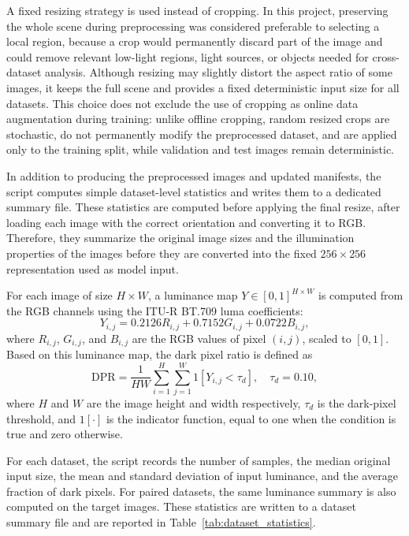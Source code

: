 A fixed resizing strategy is used instead of cropping. In this project, preserving the whole scene during preprocessing was considered preferable to selecting a local region, because a crop would permanently discard part of the image and could remove relevant low-light regions, light sources, or objects needed for cross-dataset analysis. Although resizing may slightly distort the aspect ratio of some images, it keeps the full scene and provides a fixed deterministic input size for all datasets. This choice does not exclude the use of cropping as online data augmentation during training: unlike offline cropping, random resized crops are stochastic, do not permanently modify the preprocessed dataset, and are applied only to the training split, while validation and test images remain deterministic.

In addition to producing the preprocessed images and updated manifests, the script computes simple dataset-level statistics and writes them to a dedicated summary file. These statistics are computed before applying the final resize, after loading each image with the correct orientation and converting it to RGB. Therefore, they summarize the original image sizes and the illumination properties of the images before they are converted into the fixed $256 \times 256$ representation used as model input.

For each image of size $H \times W$, a luminance map $Y \in [0,1]^{H \times W}$ is computed from the RGB channels using the ITU-R BT.709 luma coefficients:
\begin{equation}
	Y_{i,j} = 0.2126R_{i,j} + 0.7152G_{i,j} + 0.0722B_{i,j},
	\label{eq:luminance}
\end{equation}
where $R_{i,j}$, $G_{i,j}$, and $B_{i,j}$ are the RGB values of pixel $(i,j)$, scaled to $[0,1]$. Based on this luminance map, the dark pixel ratio is defined as
\begin{equation}
	\mathrm{DPR} =
	\frac{1}{HW}
	\sum_{i=1}^{H}
	\sum_{j=1}^{W}
	1\left[Y_{i,j} < \tau_d\right],
	\quad
	\tau_d = 0.10,
	\label{eq:dpr}
\end{equation}
where $H$ and $W$ are the image height and width respectively, $\tau_d$ is the dark-pixel threshold, and $1[\cdot]$ is the indicator function, equal to one when the condition is true and zero otherwise.

For each dataset, the script records the number of samples, the median original input size, the mean and standard deviation of input luminance, and the average fraction of dark pixels. For paired datasets, the same luminance summary is also computed on the target images. These statistics are written to a dataset summary file and are reported in Table~\ref{tab:dataset_statistics}.

